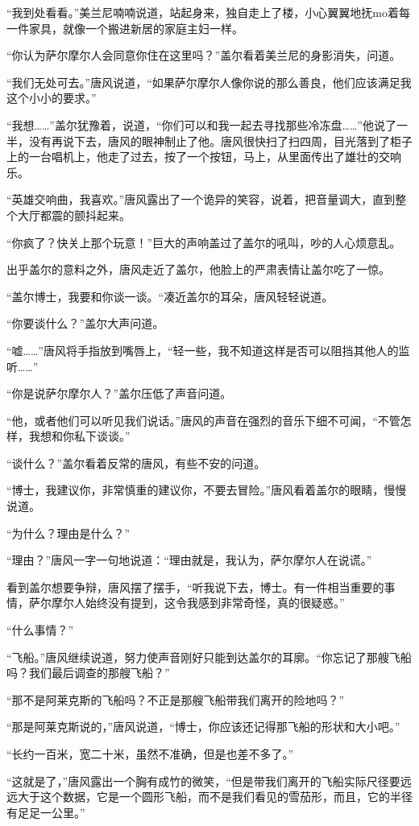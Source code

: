 “我到处看看。”美兰尼喃喃说道，站起身来，独自走上了楼，小心翼翼地抚mo着每一件家具，就像一个搬进新居的家庭主妇一样。

“你认为萨尔摩尔人会同意你住在这里吗？”盖尔看着美兰尼的身影消失，问道。

“我们无处可去。”唐风说道，“如果萨尔摩尔人像你说的那么善良，他们应该满足我这个小小的要求。”

“我想……”盖尔犹豫着，说道，“你们可以和我一起去寻找那些冷冻盘……”他说了一半，没有再说下去，唐风的眼神制止了他。唐风很快扫了扫四周，目光落到了柜子上的一台唱机上，他走了过去，按了一个按钮，马上，从里面传出了雄壮的交响乐。

“英雄交响曲，我喜欢。”唐风露出了一个诡异的笑容，说着，把音量调大，直到整个大厅都震的颤抖起来。

“你疯了？快关上那个玩意！”巨大的声响盖过了盖尔的吼叫，吵的人心烦意乱。

出乎盖尔的意料之外，唐风走近了盖尔，他脸上的严肃表情让盖尔吃了一惊。

“盖尔博士，我要和你谈一谈。“凑近盖尔的耳朵，唐风轻轻说道。

“你要谈什么？”盖尔大声问道。

“嘘……”唐风将手指放到嘴唇上，“轻一些，我不知道这样是否可以阻挡其他人的监听……”

“你是说萨尔摩尔人？”盖尔压低了声音问道。

“他，或者他们可以听见我们说话。”唐风的声音在强烈的音乐下细不可闻，“不管怎样，我想和你私下谈谈。”

“谈什么？”盖尔看着反常的唐风，有些不安的问道。

“博士，我建议你，非常慎重的建议你，不要去冒险。”唐风看着盖尔的眼睛，慢慢说道。

“为什么？理由是什么？”

“理由？”唐风一字一句地说道：“理由就是，我认为，萨尔摩尔人在说谎。”

看到盖尔想要争辩，唐风摆了摆手，“听我说下去，博士。有一件相当重要的事情，萨尔摩尔人始终没有提到，这令我感到非常奇怪，真的很疑惑。”

“什么事情？”

“飞船。”唐风继续说道，努力使声音刚好只能到达盖尔的耳廓。“你忘记了那艘飞船吗？我们最后调查的那艘飞船？”

“那不是阿莱克斯的飞船吗？不正是那艘飞船带我们离开的险地吗？”

“那是阿莱克斯说的，”唐风说道，“博士，你应该还记得那飞船的形状和大小吧。”

“长约一百米，宽二十米，虽然不准确，但是也差不多了。”

“这就是了，”唐风露出一个胸有成竹的微笑，“但是带我们离开的飞船实际尺径要远远大于这个数据，它是一个圆形飞船，而不是我们看见的雪茄形，而且，它的半径有足足一公里。”

